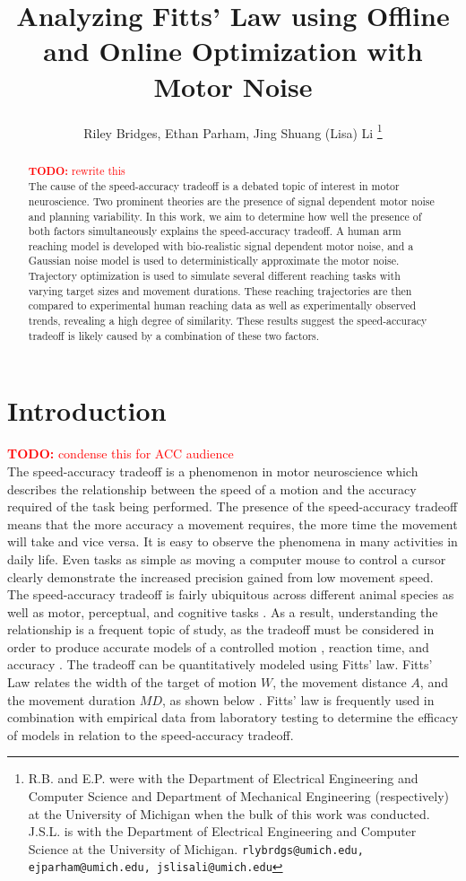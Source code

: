 \documentclass[letterpaper, 10pt, conference]{ieeeconf}
\title{\LARGE \bf Analyzing Fitts' Law using Offline and Online Optimization with Motor Noise}
\author{Riley Bridges, Ethan Parham, Jing Shuang (Lisa) Li 
\thanks{R.B. and E.P. were with the Department of Electrical Engineering and Computer Science and Department of Mechanical Engineering (respectively) at the University of Michigan when the bulk of this work was conducted. J.S.L. is with the Department of Electrical Engineering and Computer Science at the University of Michigan. {\tt\small rlybrdgs@umich.edu, ejparham@umich.edu, jslisali@umich.edu}}
}
\newcommand{\todo}[1]{\textcolor{red}{\textbf{TODO:} #1}}
\begin{document}
\maketitle
\thispagestyle{plain}
\pagestyle{plain}

\begin{abstract}
\todo{rewrite this} \\
The cause of the speed-accuracy tradeoff is a debated topic of interest in motor neuroscience. Two prominent theories are the presence of signal dependent motor noise and planning variability. In this work, we aim to determine how well the presence of both factors simultaneously explains the speed-accuracy tradeoff. A human arm reaching model is developed with bio-realistic signal dependent motor noise, and a Gaussian noise model is used to deterministically approximate the motor noise. Trajectory optimization is used to simulate several different reaching tasks with varying target sizes and movement durations. These reaching trajectories are then compared to experimental human reaching data as well as experimentally observed trends, revealing a high degree of similarity. These results suggest the speed-accuracy tradeoff is likely caused by a combination of these two factors.
\end{abstract}

\section{Introduction}
\todo{condense this for ACC audience} \\
The speed-accuracy tradeoff is a phenomenon in motor neuroscience which describes the relationship between the speed of a motion and the accuracy required of the task being performed. The presence of the speed-accuracy tradeoff means that the more accuracy a movement requires, the more time the movement will take and vice versa. It is easy to observe the phenomena in many activities in daily life. Even tasks as simple as moving a computer mouse to control a cursor clearly demonstrate the increased precision gained from low movement speed. The speed-accuracy tradeoff is fairly ubiquitous across different animal species as well as motor, perceptual, and cognitive tasks \cite{zimmerman_book}. As a result, understanding the relationship is a frequent topic of study, as the tradeoff must be considered in order to produce accurate models of a controlled motion \cite{speed_accuracy_history}, reaction time, and accuracy \cite{hierarchical_speed_accuracy}. The tradeoff can be quantitatively modeled using Fitts’ law. Fitts’ Law relates the width of the target of motion $W$, the movement distance $A$, and the movement duration $MD$, as shown below \cite{fitts_law}. Fitts' law is frequently used in combination with empirical data from laboratory testing to determine the efficacy of models in relation to the speed-accuracy tradeoff.  
\end{document}
